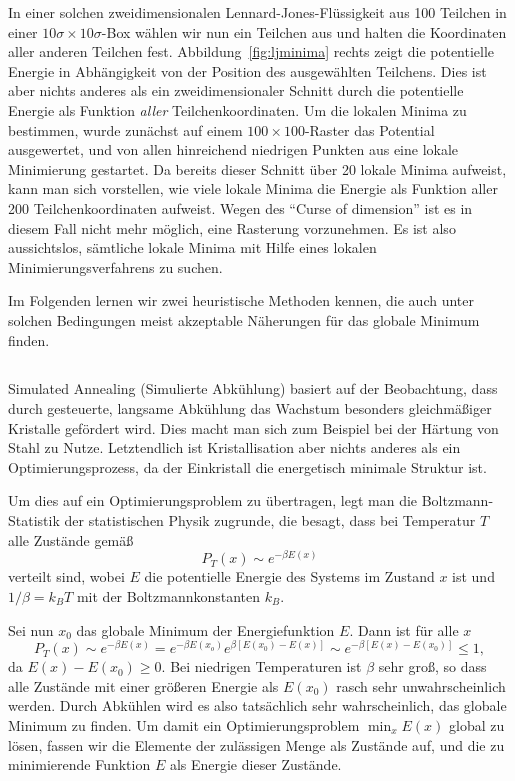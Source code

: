 In einer solchen zweidimensionalen Lennard-Jones-Flüssigkeit aus 100
Teilchen in einer $10\sigma\times 10\sigma$-Box wählen wir nun ein
Teilchen aus und halten die Koordinaten aller anderen Teilchen
fest. Abbildung~\ref{fig:ljminima} rechts zeigt die potentielle
Energie in Abhängigkeit von der Position des ausgewählten
Teilchens. Dies ist aber nichts anderes als ein zweidimensionaler
Schnitt durch die potentielle Energie als Funktion \emph{aller}
Teilchenkoordinaten. Um die lokalen Minima zu bestimmen, wurde
zunächst auf einem $100\times 100$-Raster das Potential ausgewertet,
und von allen hinreichend niedrigen Punkten aus eine lokale
Minimierung gestartet. Da bereits dieser Schnitt über 20 lokale Minima
aufweist, kann man sich vorstellen, wie viele lokale Minima die
Energie als Funktion aller 200 Teilchenkoordinaten aufweist.  Wegen
des ``Curse of dimension'' ist es in diesem Fall nicht mehr möglich,
eine Rasterung vorzunehmen. Es ist also aussichtslos, sämtliche lokale
Minima mit Hilfe eines lokalen Minimierungsverfahrens zu suchen.

Im Folgenden lernen wir zwei heuristische Methoden kennen, die auch
unter solchen Bedingungen meist akzeptable Näherungen für das globale
Minimum finden.

\subsection{}

Simulated Annealing (Simulierte Abkühlung) basiert auf der
Beobachtung, dass durch gesteuerte, langsame Abkühlung das Wachstum
besonders gleichmäßiger Kristalle gefördert wird. Dies macht man sich
zum Beispiel bei der Härtung von Stahl zu Nutze. Letztendlich ist
Kristallisation aber nichts anderes als ein Optimierungsprozess, da
der Einkristall die energetisch minimale Struktur ist.

Um dies auf ein Optimierungsproblem zu übertragen, legt man die
Boltzmann-Statistik der statistischen Physik zugrunde, die besagt,
dass bei Temperatur $T$ alle Zustände gemäß
\begin{equation}
  P_T(x)\sim e^{-\beta E(x)}
\end{equation}
verteilt sind, wobei $E$ die potentielle Energie des Systems im
Zustand $x$ ist und $1/\beta=k_BT$ mit der Boltzmannkonstanten $k_B$.

Sei nun $x_0$ das globale Minimum der Energiefunktion $E$. Dann ist
für alle $x$
\begin{equation}
  P_T(x)\sim e^{-\beta E(x)} = e^{-\beta E(x_o)}e^{\beta [E(x_0) - E(x)]}
  \sim e^{-\beta [E(x) - E(x_0)]} \le 1,
\end{equation}
da $E(x) - E(x_0)\ge 0$. Bei niedrigen Temperaturen ist $\beta$ sehr
groß, so dass alle Zustände mit einer größeren Energie als $E(x_0)$
rasch sehr unwahrscheinlich werden. Durch Abkühlen wird es also
tatsächlich sehr wahrscheinlich, das globale Minimum zu finden. Um
damit ein Optimierungsproblem $\min_{x} E(x)$ global zu lösen, fassen
wir die Elemente der zulässigen Menge als Zustände auf, und die zu
minimierende Funktion $E$ als Energie dieser Zustände.

